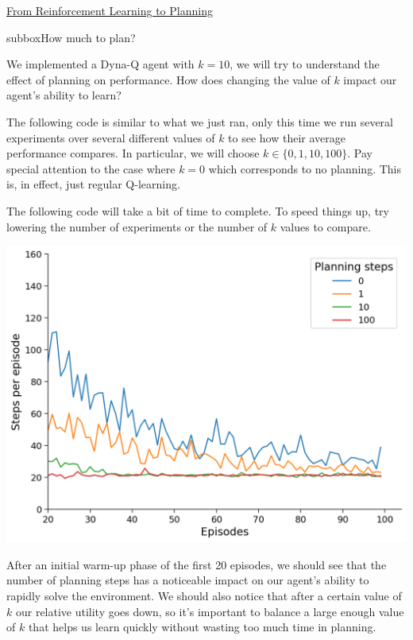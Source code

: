 \begin{textbox}{\href{https://compneuro.neuromatch.io/tutorials/W3D4_ReinforcementLearning/student/W3D4_Tutorial4.html}{From Reinforcement Learning to Planning } }

\begin{subbox}{subbox}{How much to plan?}
\scriptsize

We implemented a Dyna-Q agent with $k=10$, we will try to understand the effect of planning on performance. How does changing the value of $k$ impact our agent's ability to learn?

The following code is similar to what we just ran, only this time we run several experiments over several different values of $k$ to see how their average performance compares. In particular, we will choose $k \in \{0, 1, 10, 100\}$. Pay special attention to the case where $k = 0$ which corresponds to no planning. This is, in effect, just regular Q-learning.

The following code will take a bit of time to complete. To speed things up, try lowering the number of experiments or the number of $k$ values to compare.


\begin{center}
    
\includegraphics[scale=0.25]{Figures/RL/RL_Figure18.png}
\end{center}
After an initial warm-up phase of the first 20 episodes, we should see that the number of planning steps has a noticeable impact on our agent's ability to rapidly solve the environment. We should also notice that after a certain value of $k$ our relative utility goes down, so it's important to balance a large enough value of $k$ that helps us learn quickly without wasting too much time in planning.

\end{subbox}
\end{textbox}
